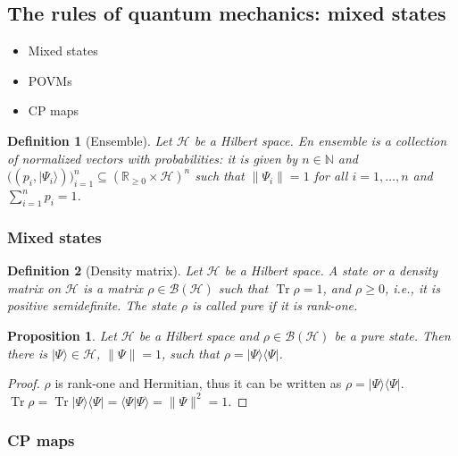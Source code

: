 \documentclass{article}
\newtheorem{proposition}{Proposition}
\newtheorem{definition}{Definition}
\theoremstyle{definition}
\newcommand{\tr}{\operatorname{Tr}}
\newcommand{\ket}[1]{\vert #1 \rangle}
\newcommand{\bra}[1]{\langle #1 \vert}
\newcommand{\scalprod}[2]{\langle #1 \vert #2 \rangle}
\newcommand{\bounded}[1]{\mathcal{B}(#1)}
\begin{document}
\subsection{The rules of quantum mechanics: mixed states}
\begin{itemize}
  \item Mixed states
  \item POVMs
  \item CP maps
\end{itemize}


\begin{definition}[Ensemble]
  Let $\mathcal{H}$ be a Hilbert space. En \emph{ensemble} is a collection of normalized vectors with probabilities: it is given by $n\in\mathbb{N}$ and $\big((p_i, \ket{\Psi_i})\big)_{i=1}^n \subseteq (\mathbb{R}_{\geq 0} \times \mathcal{H})^n$ such that $\|\Psi_i\| = 1$ for all $i=1,\dots,n$ and $\sum_{i=1}^n p_i = 1$.
\end{definition}
\subsubsection{Mixed states}

\begin{definition}[Density matrix]
  Let $\mathcal{H}$ be a Hilbert space. A \emph{state} or a \emph{density matrix} on $\mathcal{H}$ is a matrix $\rho\in\bounded{\mathcal{H}}$ such that $\tr\rho = 1$, and $\rho\geq 0$, i.e., it is positive semidefinite. The state $\rho$ is called \emph{pure} if it is rank-one. 
\end{definition}

\begin{proposition}
  Let $\mathcal{H}$ be a Hilbert space and $\rho\in\bounded{\mathcal{H}}$ be a pure state. Then there is $\ket{\Psi}\in\mathcal{H}$, $\|\Psi\| = 1$, such that $\rho  = \ket{\Psi} \bra{\Psi}$.
\end{proposition}

\begin{proof}
   $\rho$ is rank-one and Hermitian, thus it can be written as $\rho = \ket{\Psi}\bra{\Psi}$. $\tr \rho = \tr\ket{\Psi} \bra{\Psi} = \scalprod{\Psi}{\Psi} = \|\Psi\|^2 = 1$.
\end{proof}





\subsubsection{CP maps}
\end{document}
